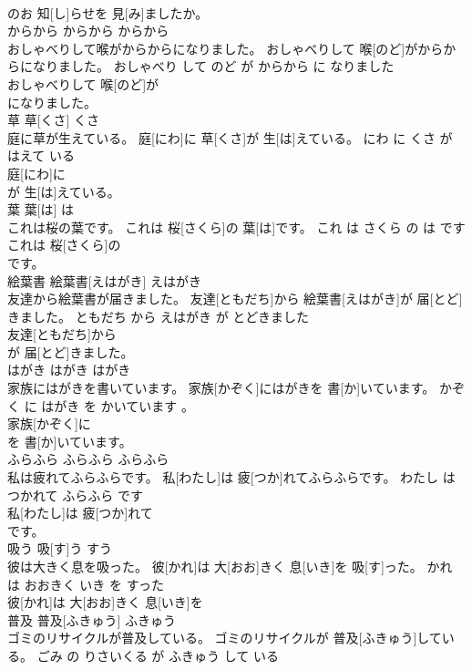 \documentclass[8pt]{extreport}
\begin{document}
\begin{CJK}{UTF8}{min}
\\	のお 知[し]らせを 見[み]ましたか。		
\\	からから	からから	からから	
\\	おしゃべりして喉がからからになりました。	おしゃべりして 喉[のど]がからからになりました。	おしゃべり して のど が からから に なりました	
\\	おしゃべりして 喉[のど]が
\\	になりました。		
\\	草	草[くさ]	くさ	
\\	庭に草が生えている。	庭[にわ]に 草[くさ]が 生[は]えている。	にわ に くさ が はえて いる	
\\	庭[にわ]に
\\	が 生[は]えている。		
\\	葉	葉[は]	は	
\\	これは桜の葉です。	これは 桜[さくら]の 葉[は]です。	これ は さくら の は です	
\\	これは 桜[さくら]の
\\	です。		
\\	絵葉書	絵葉書[えはがき]	えはがき	
\\	友達から絵葉書が届きました。	友達[ともだち]から 絵葉書[えはがき]が 届[とど]きました。	ともだち から えはがき が とどきました	
\\	友達[ともだち]から
\\	が 届[とど]きました。		
\\	はがき	はがき	はがき	
\\	家族にはがきを書いています。	家族[かぞく]にはがきを 書[か]いています。	かぞく に はがき を かいています 。	
\\	家族[かぞく]に
\\	を 書[か]いています。		
\\	ふらふら	ふらふら	ふらふら	
\\	私は疲れてふらふらです。	私[わたし]は 疲[つか]れてふらふらです。	わたし は つかれて ふらふら です	
\\	私[わたし]は 疲[つか]れて
\\	です。		
\\	吸う	吸[す]う	すう	
\\	彼は大きく息を吸った。	彼[かれ]は 大[おお]きく 息[いき]を 吸[す]った。	かれ は おおきく いき を すった	
\\	彼[かれ]は 大[おお]きく 息[いき]を
\\	普及	普及[ふきゅう]	ふきゅう	
\\	ゴミのリサイクルが普及している。	ゴミのリサイクルが 普及[ふきゅう]している。	ごみ の りさいくる が ふきゅう して いる	

\end{CJK}
\end{document}
